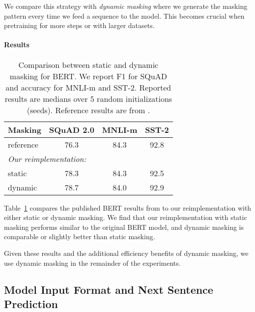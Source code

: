 \documentclass[11pt]{article}
\newcommand{\bertbase}{BERT}
\begin{document}
We compare this strategy with \emph{dynamic masking} where we generate the masking pattern every time we feed a sequence to the model.
This becomes crucial when pretraining for more steps or with larger datasets.

\paragraph{Results}

\begin{table}[t]
\begin{center}
\begin{tabular}{lccc}
\toprule
\bf Masking & \bf SQuAD 2.0 & \bf MNLI-m & \bf SST-2 \\
\midrule
reference & 76.3 & 84.3 & 92.8 \\
\midrule
\multicolumn{4}{l}{\emph{Our reimplementation:}} \\
static & 78.3 & 84.3 & 92.5 \\
dynamic & 78.7 & 84.0 & 92.9 \\
\bottomrule
\end{tabular}
\end{center}
\caption{Comparison between static and dynamic masking for \bertbase{}.
We report F1 for SQuAD and accuracy for MNLI-m and SST-2.
Reported results are medians over 5 random initializations (seeds).
Reference results are from .}
\label{tab:static_vs_dynamic_masking}
\end{table}
 
Table~\ref{tab:static_vs_dynamic_masking} compares the published \bertbase{} results from  to our reimplementation with either static or dynamic masking.
We find that our reimplementation with static masking performs similar to the original BERT model, and dynamic masking is comparable or slightly better than static masking.

Given these results and the additional efficiency benefits of dynamic masking, we use dynamic masking in the remainder of the experiments.



\subsection{Model Input Format and Next Sentence Prediction} \label{sec:model_input_nsp}
\end{document}
